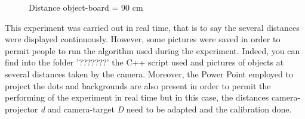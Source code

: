 \begin{figure}[!h] 
\centering
{}
\quad 
{}
\caption{Distance object-board = 90 cm}
\end{figure}


This experiment was carried out in real time, that is to say the several distances were displayed continuously. However, some pictures were saved in order to permit people to run the algorithm used during the experiment. Indeed, you can find into the folder '???????' the C++ script used and pictures of objects at several distances taken by the camera. Moreover, the Power Point employed to project the dots and backgrounds are also present in order to permit the performing of the experiment in real time but in this case, the distances camera-projector \emph{d} and camera-target \emph{D} need to be adapted and the calibration done.



